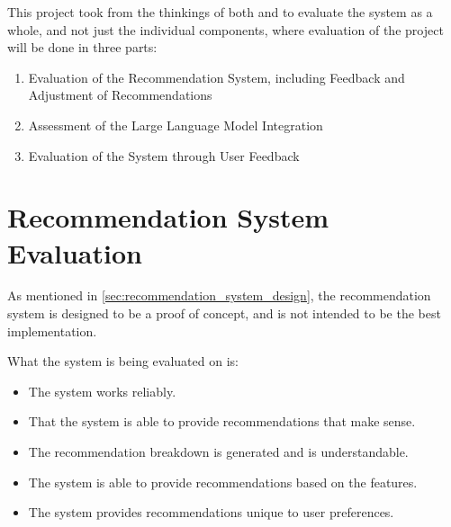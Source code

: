 





This project took from the thinkings of both \cite{huang2024conceptevaluationprotocol} and \cite{10.1007/s10462-022-10229-x} to evaluate the system as a whole, and not just the individual components, where evaluation of the project will be done in three parts:
\begin{enumerate}
    \item Evaluation of the Recommendation System, including Feedback and Adjustment of Recommendations
    \item Assessment of the Large Language Model Integration
    \item Evaluation of the System through User Feedback
\end{enumerate}

\section{Recommendation System Evaluation}
\label{sec:recommendation_system_evaluation}
As mentioned in \cref{sec:recommendation_system_design}, the recommendation system is designed to be a proof of concept, and is not intended to be the best implementation.

What the system is being evaluated on is:
\begin{itemize}
    \item The system works reliably.
    \item That the system is able to provide recommendations that make sense.
    \item The recommendation breakdown is generated and is understandable.
    \item The system is able to provide recommendations based on the features.
    \item The system provides recommendations unique to user preferences.
\end{itemize}


